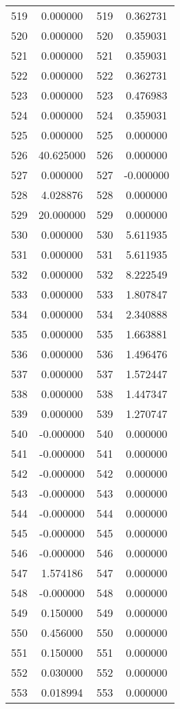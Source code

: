 \documentclass[12pt]{article}
\begin{document}
\begin{longtable}{@{}cccc@{}}
519 & 0.000000 & 519 & 0.362731 \\
520 & 0.000000 & 520 & 0.359031 \\
521 & 0.000000 & 521 & 0.359031 \\
522 & 0.000000 & 522 & 0.362731 \\
523 & 0.000000 & 523 & 0.476983 \\
524 & 0.000000 & 524 & 0.359031 \\
525 & 0.000000 & 525 & 0.000000 \\
526 & 40.625000 & 526 & 0.000000 \\
527 & 0.000000 & 527 & -0.000000 \\
528 & 4.028876 & 528 & 0.000000 \\
529 & 20.000000 & 529 & 0.000000 \\
530 & 0.000000 & 530 & 5.611935 \\
531 & 0.000000 & 531 & 5.611935 \\
532 & 0.000000 & 532 & 8.222549 \\
533 & 0.000000 & 533 & 1.807847 \\
534 & 0.000000 & 534 & 2.340888 \\
535 & 0.000000 & 535 & 1.663881 \\
536 & 0.000000 & 536 & 1.496476 \\
537 & 0.000000 & 537 & 1.572447 \\
538 & 0.000000 & 538 & 1.447347 \\
539 & 0.000000 & 539 & 1.270747 \\
540 & -0.000000 & 540 & 0.000000 \\
541 & -0.000000 & 541 & 0.000000 \\
542 & -0.000000 & 542 & 0.000000 \\
543 & -0.000000 & 543 & 0.000000 \\
544 & -0.000000 & 544 & 0.000000 \\
545 & -0.000000 & 545 & 0.000000 \\
546 & -0.000000 & 546 & 0.000000 \\
547 & 1.574186 & 547 & 0.000000 \\
548 & -0.000000 & 548 & 0.000000 \\
549 & 0.150000 & 549 & 0.000000 \\
550 & 0.456000 & 550 & 0.000000 \\
551 & 0.150000 & 551 & 0.000000 \\
552 & 0.030000 & 552 & 0.000000 \\
553 & 0.018994 & 553 & 0.000000 \\

\end{longtable}
\end{document}
